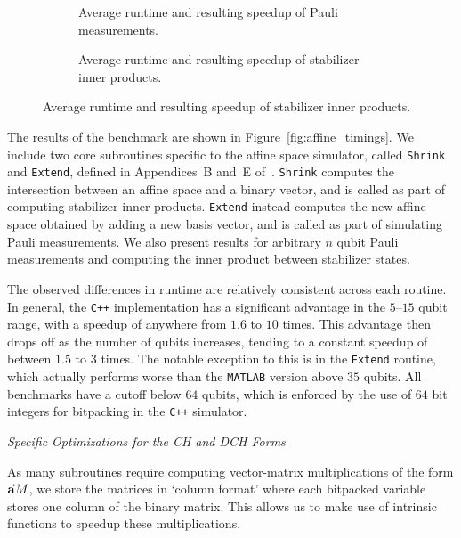 \begin{figure}[p]\ContinuedFloat
\begin{subfigure}[t]{0.9\textwidth}
    \begin{scaletikzpicturetowidth}{\textwidth}
        
    \end{scaletikzpicturetowidth}
    \caption{Average runtime and resulting speedup of Pauli measurements.}
\end{subfigure}
\begin{subfigure}[t]{0.9\textwidth}
    \caption{Average runtime and resulting speedup of stabilizer inner products.}
    \begin{scaletikzpicturetowidth}{\textwidth}
        
    \end{scaletikzpicturetowidth}
\end{subfigure}
\end{figure}
The results of the benchmark are shown in Figure~\ref{fig:affine_timings}. We include two core subroutines specific to the affine space simulator, called \texttt{Shrink} and \texttt{Extend}, defined in Appendices~B and~E of~\cite{Bravyi2016}. \texttt{Shrink} computes the intersection between an affine space and a binary vector, and is called as part of computing stabilizer inner products. \texttt{Extend} instead computes the new affine space obtained by adding a new basis vector, and is called as part of simulating Pauli measurements. We also present results for arbitrary $n$ qubit Pauli measurements and computing the inner product between stabilizer states.\par
The observed differences in runtime are relatively consistent across each routine. In general, the \texttt{C++} implementation has a significant advantage in the $5$--$15$ qubit range, with a speedup of anywhere from $1.6$ to $10$ times. This advantage then drops off as the number of qubits increases, tending to a constant speedup of between $1.5$ to $3$ times. The notable exception to this is in the \texttt{Extend} routine, which actually performs worse than the \texttt{MATLAB} version above $35$ qubits. All benchmarks have a cutoff below $64$ qubits, which is enforced by the use of $64$ bit integers for bitpacking in the \texttt{C++} simulator.
\par
\large{\itshape{Specific Optimizations for the CH and DCH Forms}}\par
As many subroutines require computing vector-matrix multiplications of the form $\va{a}M$, we store the matrices in `column format' where each bitpacked variable stores one column of the binary matrix. This allows us to make use of intrinsic functions to speedup these multiplications.\par
